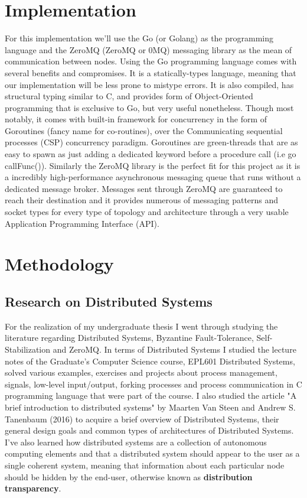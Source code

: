 \documentclass[12pt,a4paper]{report}
\begin{document}
		\section{Implementation}
			For this implementation we'll use the Go (or Golang) as the programming language and the ZeroMQ (ZeroMQ or 0MQ) messaging library as the mean of
				communication
				between	nodes.  Using the Go programming language comes with several benefits and compromises. It is a statically-types language, meaning that
				our implementation will be less prone to mistype errors. It is also compiled, has structural typing similar to C, and provides form of Object-Oriented programming that is exclusive to Go, but very useful nonetheless. Though most notably, it comes with built-in framework for
				concurrency in the form of Goroutines (fancy name for co-routines), over the Communicating sequential processes (CSP) concurrency paradigm. 
				Goroutines are green-threads that are as easy to spawn as just adding a dedicated keyword before a procedure call (i.e go callFunc()).
				Similarly the ZeroMQ library is the perfect fit for this project as it is a incredibly high-performance asynchronous messaging queue that
				runs without a dedicated message broker. Messages sent through ZeroMQ are guaranteed to reach their destination and it provides numerous of
				messaging patterns and socket
				types for every type of topology and architecture through a very usable Application Programming Interface (API).
		\section{Methodology}
		
			\subsection{Research on Distributed Systems}
			For the realization of my undergraduate thesis I went through studying the literature regarding Distributed
			Systems, Byzantine Fault-Tolerance, Self-Stabilization and ZeroMQ. In terms of Distributed Systems I studied the lecture notes of the
			Graduate's Computer Science course, EPL601 Distributed Systems, solved various examples, exercises and projects about process management,
			signals, low-level input/output, forking processes and process communication in C programming language that were part of the course. I also
			studied the article "A brief introduction to distributed systems" by Maarten Van Steen and Andrew S. Tanenbaum (2016) \cite{distributedSystems}
			to acquire a brief overview of Distributed Systems, their general design goals and common types of architectures of Distributed Systems.
			I've also learned how distributed systems are a collection of autonomous computing elements and that a distributed system should appear to
			the user as a single coherent system, meaning that information about each particular node should be hidden by the end-user, otherwise known as
			\textbf{distribution transparency}.
\end{document}

